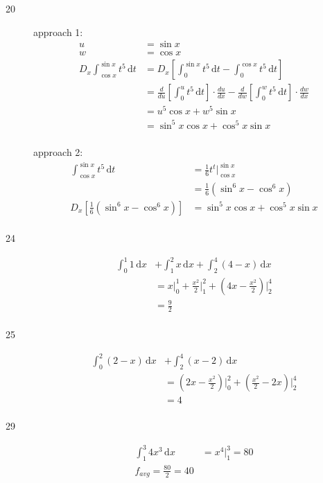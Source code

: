 \documentclass{exam}
\begin{document}
\begin{description}
\item[20]
approach 1:
\begin{align*}
  u &= \sin x \\
  w &= \cos x
\\
  D_x \int_{\cos x}^{\sin x} t^5 \, \mathrm{d}t &= D_x \left[ \int_0^{\sin x} t^5 \, \mathrm{d}t - \int_0^{\cos x} t^5 \, \mathrm{d}t \right] \\
  &= \frac{d}{du} \left[ \int_0^u t^5 \, \mathrm{d}t \right] \cdot \frac{du}{dx} - \frac{d}{dw} \left[ \int_0^w t^5 \, \mathrm{d}t \right] \cdot \frac{dw}{dx} \\
  &= u^5 \cos x + w^5 \sin x \\
  &= \sin^5 x \cos x + \cos^5 x \sin x \\
\end{align*}

approach 2:
\begin{align*}
  \int_{\cos x}^{\sin x} t^5 \, \mathrm{d}t &= \frac{1}{6} t^t \bigg|_{\cos x}^{\sin x} \\
   &= \frac{1}{6} (\sin^6 x - \cos^6 x) \\
   D_x \left[ \frac{1}{6} (\sin^6 x - \cos^6 x) \right] &= \sin^5 x \cos x + \cos^5 x \sin x \\
\end{align*}

\item[24]
\begin{align*}
  \int_0^1 1 \, \mathrm{d}x &+ \int_1^2 x \, \mathrm{d}x + \int_2^4 (4 - x) \, \mathrm{d}x \\
  &= x \bigg|_0^1 + \frac{x^2}{2} \bigg|_1^2 + \left(4x - \frac{x^2}{2}\right) \bigg|_2^4  \\
  &= \frac{9}{2} \\
\end{align*}

\item[25]
\begin{align*}
  \int_0^2 (2 - x) \, \mathrm{d}x &+ \int_2^4 (x - 2) \, \mathrm{d}x \\
  &= \left(2x - \frac{x^2}{2} \right) \bigg|_0^2 + \left(\frac{x^2}{2} - 2x \right) \bigg|_2^4 \\
  &= 4 \\
\end{align*}

\item[29]
\begin{align*}
  \int_1^3 4x^3 \, \mathrm{d}x &= x^4 \bigg|_1^3 = 80 \\
  f_{avg} = \frac{80}{2} = 40 \\
\end{align*}


\end{description}
\end{document}
